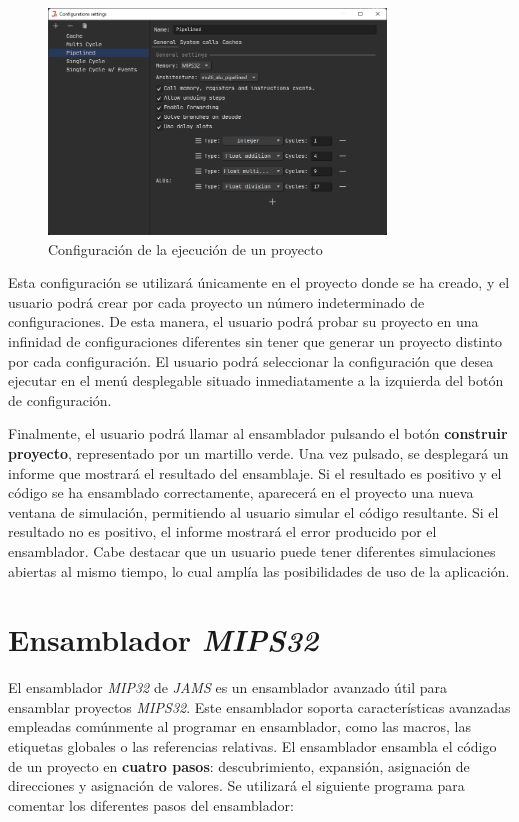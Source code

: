 \begin{figure}[h]
    \centering
    \includegraphics[width=0.8\textwidth]{images/mips/mips-configuration}
    \caption{Configuración de la ejecución de un proyecto}
    \label{fig:jams-configuration}
\end{figure}

Esta configuración se utilizará únicamente en el proyecto
donde se ha creado, y el usuario podrá crear por cada proyecto
un número indeterminado de configuraciones.
De esta manera, el usuario podrá probar su proyecto en una infinidad
de configuraciones diferentes sin tener que generar un proyecto
distinto por cada configuración.
El usuario podrá seleccionar la configuración que desea ejecutar en
el menú desplegable situado inmediatamente a la izquierda del
botón de configuración.

Finalmente, el usuario podrá llamar al ensamblador pulsando el botón
\textbf{construir proyecto}, representado por un martillo verde.
Una vez pulsado, se desplegará un informe que mostrará el resultado del ensamblaje.
Si el resultado es positivo y el código se ha ensamblado correctamente,
aparecerá en el proyecto una nueva ventana de simulación,
permitiendo al usuario simular el código resultante.
Si el resultado no es positivo, el informe mostrará el error producido
por el ensamblador.
Cabe destacar que un usuario puede tener diferentes simulaciones abiertas
al mismo tiempo, lo cual amplía las posibilidades de uso de la
aplicación.


\section{Ensamblador \textit{MIPS32}}\label{sec:ensamblador-mips32}

El ensamblador \textit{MIP32} de \textit{JAMS} es un ensamblador avanzado
útil para ensamblar proyectos \textit{MIPS32}.
Este ensamblador soporta características avanzadas empleadas
comúnmente al programar en ensamblador, como las macros,
las etiquetas globales o las referencias relativas.
El ensamblador ensambla el código de un proyecto en \textbf{cuatro pasos}:
descubrimiento, expansión, asignación de direcciones y asignación de valores.
Se utilizará el siguiente programa para comentar los diferentes pasos del ensamblador:

